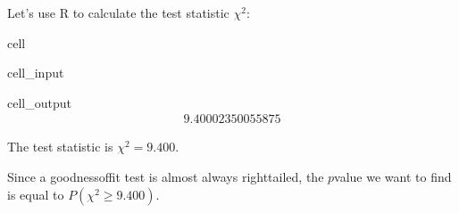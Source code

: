 \documentclass[letterpaper,10pt,english]{jupyterBook}
\begin{document}
\sphinxAtStartPar
Let’s use R to calculate the test statistic \(\chi^2\):

\begin{sphinxuseclass}{cell}\begin{sphinxVerbatimInput}

\begin{sphinxuseclass}{cell_input}
\begin{sphinxVerbatim}[commandchars=\\\{\}]

\end{sphinxVerbatim}

\end{sphinxuseclass}\end{sphinxVerbatimInput}
\begin{sphinxVerbatimOutput}

\begin{sphinxuseclass}{cell_output}\begin{equation*}
\begin{split}9.40002350055875\end{split}
\end{equation*}
\end{sphinxuseclass}\end{sphinxVerbatimOutput}

\end{sphinxuseclass}
\sphinxAtStartPar
The test statistic is \(\chi^2 = 9.400\).

\sphinxAtStartPar
Since a goodness\sphinxhyphen{}of\sphinxhyphen{}fit test is almost always right\sphinxhyphen{}tailed, the \(p\)\sphinxhyphen{}value we want to find is equal to \(P(\chi^2 \geq 9.400)\).
\end{document}
